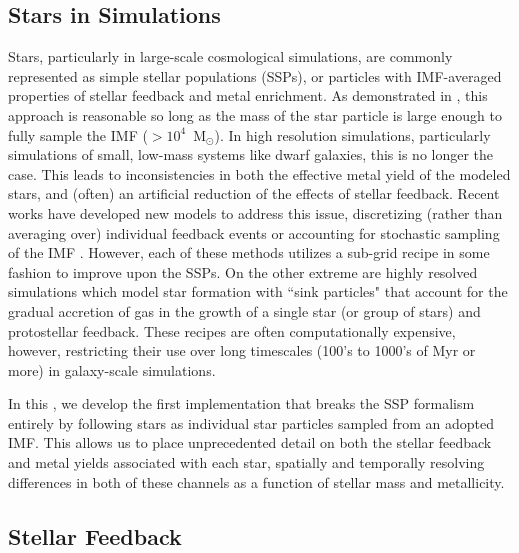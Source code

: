 
\subsection{Stars in Simulations} \label{intro:sec:stars}

Stars, particularly in large-scale cosmological simulations, are commonly represented as simple stellar populations (SSPs), or particles with IMF-averaged properties of stellar feedback and metal enrichment. As demonstrated in \cite{Revaz2016}, this approach is reasonable so long as the mass of the star particle is large enough to fully sample the IMF ($> 10^{4}$~M$_{\odot}$). In high resolution simulations, particularly simulations of small, low-mass systems like dwarf galaxies, this is no longer the case. This leads to inconsistencies in both the effective metal yield of the modeled stars, and (often) an artificial reduction of the effects of stellar feedback. Recent works have developed new models to address this issue, discretizing (rather than averaging over) individual feedback events \citep[e.g.][]{MUGS2010,FIRE,Hopkins2018,Rosdahl2018} or accounting for stochastic sampling of the IMF \citep{Hu2016,Hu2017,Applebaum2018,Su2018}. However, each of these methods utilizes a sub-grid recipe in some fashion to improve upon the SSPs. On the other extreme are highly resolved simulations which model star formation with ``sink particles" \citep[see for example ][]{Krumholz2004,Federrath2010,GongOstriker2013,BleulerTeyssier2014,Sormani2017} that account for the gradual accretion of gas in the growth of a single star (or group of stars) and protostellar feedback. These recipes are often computationally expensive, however, restricting their use over long timescales (100's to 1000's of Myr or more) in galaxy-scale simulations.

In this \dissertation, we develop the first implementation that breaks the SSP formalism entirely by following stars as individual star particles sampled from an adopted IMF. This allows us to place unprecedented detail on both the stellar feedback and metal yields associated with each star, spatially and temporally resolving differences in both of these channels as a function of stellar mass and metallicity.

\subsection{Stellar Feedback} \label{intro:sec:feedback}

